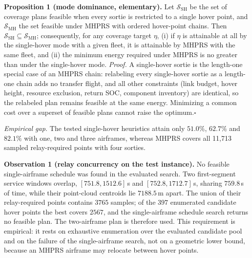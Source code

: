 \documentclass[journal]{IEEEtran}
\begin{document}
\textbf{Proposition 1 (mode dominance, elementary).} Let $\mathcal{S}_{\mathrm{SH}}$ be
the set of coverage plans feasible when every sortie is restricted to a single
hover point, and $\mathcal{S}_{\mathrm{MH}}$ the set feasible under MHPRS with
ordered hover-point chains. Then
$\mathcal{S}_{\mathrm{SH}}\subseteq\mathcal{S}_{\mathrm{MH}}$; consequently,
for any coverage target $\eta$, (i) if $\eta$ is attainable at all by the
single-hover mode with a given fleet, it is attainable by MHPRS with the same
fleet, and (ii) the minimum energy required under MHPRS is no greater than
under the single-hover mode. \emph{Proof.} A single-hover sortie is the
length-one special case of an MHPRS chain: relabeling every single-hover
sortie as a length-one chain adds no transfer flight, and all other
constraints (link budget, hover height, resource exclusion, return SOC,
component inventory) are identical, so the relabeled plan remains feasible at
the same energy. Minimizing a common cost over a superset of feasible plans
cannot raise the optimum.\hfill $\square$

\noindent
\emph{Empirical gap.} The tested single-hover heuristics attain only
$51.0\%$, $62.7\%$ and $82.1\%$ with one, two and three airframes, whereas
MHPRS covers all 11,713 sampled relay-required points with four sorties.

\textbf{Observation 1 (relay concurrency on the test instance).} No feasible
single-airframe schedule was found in the evaluated search. Two first-segment
service windows overlap, $[751.8,1512.6]$\,s and
$[752.8,1712.7]$\,s, sharing $759.8$\,s of time, while their point-cloud
centroids lie $7188.5$\,m apart. The union of their relay-required points
contains $3765$ samples; of the $397$ enumerated candidate hover points the best
covers $2567$, and the single-airframe schedule search returns no feasible plan.
The two-airframe plan is therefore used. This requirement is empirical: it rests
on exhaustive enumeration over the evaluated candidate pool and on the failure
of the single-airframe search, not on a geometric lower bound, because an MHPRS
airframe may relocate between hover points.
\end{document}
